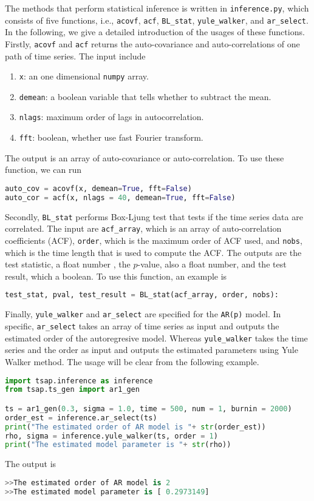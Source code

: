 
The methods that perform statistical inference is written in \texttt{inference.py}, which consists of five functions, i.e., \texttt{acovf}, \texttt{acf}, \texttt{BL\_stat}, \texttt{yule\_walker}, and  \texttt{ar\_select}.  In the following, we give a detailed introduction of the usages of these functions.
Firstly, \texttt{acovf} and  \texttt{acf} returns the auto-covariance and auto-correlations of one path of time series. The input include 
\begin{enumerate}
\item \texttt{x}: an one dimensional \texttt{numpy} array.
\item \texttt{demean}: a boolean variable that tells whether to subtract the mean.
\item  \texttt{nlags}: maximum order of lags in autocorrelation.
\item  \texttt{fft}: boolean, whether use fast Fourier transform.
\end{enumerate}
The output is an array of auto-covariance or auto-correlation. 
To use these function, we can run 
\begin{lstlisting}[language=Python]
auto_cov = acovf(x, demean=True, fft=False) 
auto_cor = acf(x, nlags = 40, demean=True, fft=False)
\end{lstlisting}
Secondly, \texttt{BL\_stat} performs Box-Ljung test that tests if the time series data are correlated.     The input are \texttt{acf\_array},  which is  an array of auto-correlation coefficients (ACF), \texttt{order}, which is the maximum order of ACF used,   and \texttt{nobs}, which is the time length that is used to compute the ACF. The outputs are the test statistic, a float number , the $p$-value, also a float number, and the test result, which  a boolean. To use this function, an example is 
\begin{lstlisting}[language=Python]
test_stat, pval, test_result = BL_stat(acf_array, order, nobs):
\end{lstlisting}
Finally,  \texttt{yule\_walker}  and  \texttt{ar\_select} are specified for the \texttt{AR(p)} model.   In specific, \texttt{ar\_select} takes an array of time series   as input and outputs the estimated order of the autoregresive model. Whereas  \texttt{yule\_walker} takes the time series and the order as input and outputs the estimated parameters using Yule Walker method. The usage will be clear from the following example.
\begin{lstlisting}[language=Python]
import tsap.inference as inference
from tsap.ts_gen import ar1_gen

ts = ar1_gen(0.3, sigma = 1.0, time = 500, num = 1, burnin = 2000)
order_est = inference.ar_select(ts)
print("The estimated order of AR model is "+ str(order_est))
rho, sigma = inference.yule_walker(ts, order = 1)
print("The estimated model parameter is "+ str(rho))
\end{lstlisting}
The output is 
\begin{lstlisting}[language=Python]
>>The estimated order of AR model is 2
>>The estimated model parameter is [ 0.2973149]
\end{lstlisting}